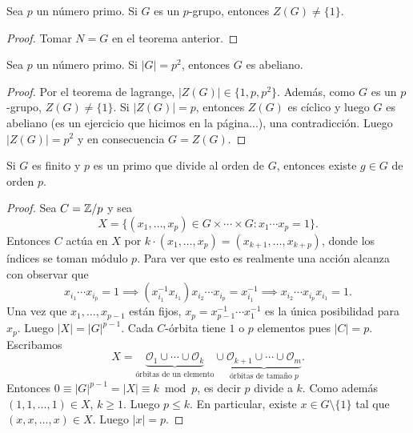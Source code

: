 \begin{corollary}
Sea $p$ un número primo. Si  
$G$ es un $p$-grupo, entonces $Z(G)\ne\{1\}$.  
\end{corollary}

\begin{proof}
Tomar $N=G$ en el teorema anterior.
\end{proof} 

\begin{corollary}
	Sea $p$ un número primo. Si $|G|=p^2$, entonces $G$ es abeliano.  
\end{corollary}


\begin{proof}
Por el teorema de lagrange, $|Z(G)|\in\{1,p,p^2\}$. Además, como $G$ es un $p$-grupo, $Z(G)\ne\{1\}$. Si $|Z(G)|=p$, entonces $Z(G)$ es cíclico y luego $G$ es abeliano (es un ejercicio que hicimos en la página...), una contradicción. Luego $|Z(G)|=p^2$ y en consecuencia $G=Z(G)$. 	
\end{proof}

\begin{theorem}[Cauchy]
Si $G$ es finito y $p$ es un primo que divide al orden de $G$, entonces existe $g\in G$ de orden $p$. 	
\end{theorem}

\begin{proof}
Sea $C=\mathbb{Z}/p$ y sea
\[
X=\{(x_1,\dots,x_p)\in G\times\cdots\times G:x_1\cdots x_p=1\}.
\]
Entonces $C$ actúa en $X$ por $k\cdot (x_1,\dots,x_p)=(x_{k+1},\dots,x_{k+p})$, donde los índices se toman módulo $p$. Para ver que esto es realmente una acción alcanza con observar
que 
\[
x_{i_1}\cdots x_{i_p}=1
\implies (x_{i_1}^{-1}x_{i_1})x_{i_2}\cdots x_{i_p}=x_{i_1}^{-1}
\implies x_{i_2}\cdots x_{i_p}x_{i_1}=1.
\]	
Una vez que $x_1,\dots,x_{p-1}$ están fijos, $x_p=x_{p-1}^{-1}\cdots x_{1}^{-1}$ es la única posibilidad para $x_p$. Luego $|X|=|G|^{p-1}$. Cada $C$-órbita tiene $1$ o $p$ elementos pues $|C|=p$. Escribamos
\[
X=\underbrace{\mathcal{O}_1\cup\cdots\cup \mathcal{O}_k}_{\text{órbitas de un elemento}}\cup\underbrace{\mathcal{O}_{k+1}\cup\cdots\cup\mathcal{O}_m}_{\text{órbitas de tamaño $p$}}.
\] 
Entonces $0\equiv |G|^{p-1}=|X|\equiv k\bmod p$, es decir $p$ divide a $k$. Como además $(1,1,\dots,1)\in X$, $k\geq 1$. Luego $p\leq k$. En particular, 
existe $x\in G\setminus\{1\}$ tal que $(x,x,\dots,x)\in X$. Luego $|x|=p$. 
\end{proof}

